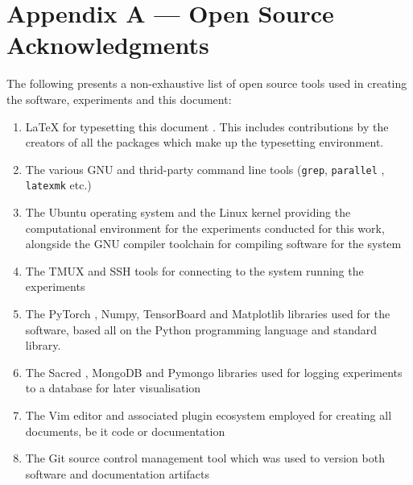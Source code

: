 \chapter{Appendix A --- Open Source Acknowledgments}
\label{ch:appendixA}

The following presents a non-exhaustive list of open source tools used in
creating the software, experiments and this document:
\begin{enumerate}
    \item \LaTeX{} for typesetting this document \citep{lamport}. This includes contributions by
        the creators of all the packages which make up the typesetting
        environment.
    \item The various GNU and thrid-party command line tools (\texttt{grep}, \texttt{parallel}
        \citep{tange_ole_2018_1146014}, \texttt{latexmk} etc.)
    \item The Ubuntu operating system and the Linux kernel
        \citep{torvalds2008linux} providing the
        computational environment for the experiments conducted for this work,
        alongside the GNU compiler toolchain for compiling software
        for the system
    \item The TMUX and SSH tools for connecting to the system running the
        experiments
    \item The PyTorch \citep{paszke2017automatic}, Numpy, TensorBoard and
        Matplotlib libraries \citep{scipy} used for the
        software, based all on the Python programming language and standard
        library.
    \item The Sacred \citep{sacred}, MongoDB and Pymongo libraries used for logging experiments
        to a database for later visualisation
    \item The Vim editor and associated plugin ecosystem employed for creating
        all documents, be it code or documentation
    \item The Git source control management tool which was used to version both
        software and documentation artifacts
\end{enumerate}
